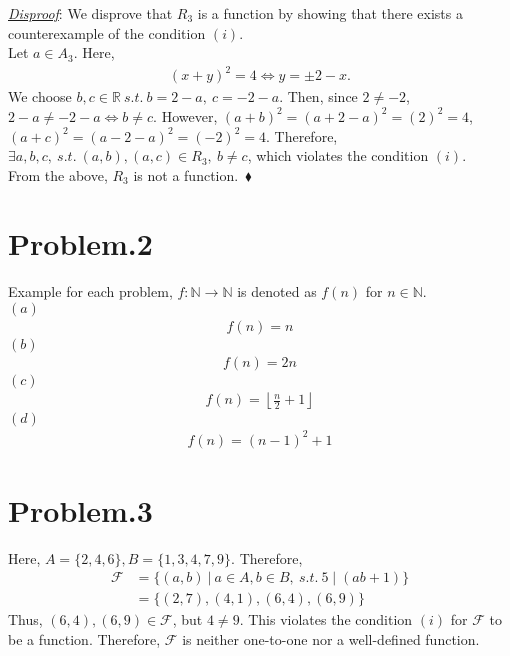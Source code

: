 \documentclass[12pt]{article}
\begin{document}
\underline{\textit{Disproof}}: We disprove that $R_3$ is a function by showing that there exists a counterexample of the condition $(i)$.\\
Let $a \in A_3$. Here,
\begin{gather*}
(x+y)^2 = 4 \Leftrightarrow y = \pm 2 - x.
\end{gather*}
We choose $b,c \in \mathbb{R} ~s.t.~ b = 2 - a,~c = - 2 - a$. Then, since $2 \neq - 2$, $2 - a \neq - 2 - a \Leftrightarrow b \neq c$. However, $(a+b)^2 = (a + 2 - a)^2 = (2)^2 = 4$, $(a+c)^2 = (a - 2 - a)^2 = (- 2)^2 = 4$. Therefore, $\exists a, b, c, ~s.t.~ (a,b),(a,c) \in R_3,~b \neq c$, which violates the condition $(i)$.\\[1em]
From the above, $R_3$ is not a function.~$\blacklozenge$\\[1em]
\section*{Problem.2}
Example for each problem, $f: \mathbb{N} \longrightarrow \mathbb{N}$ is denoted as $f(n)$ for $n \in \mathbb{N}$.\\[1em]
$(a)$\\
\begin{gather*}
f(n) = n
\end{gather*}
$(b)$\\
\begin{gather*}
f(n) = 2n
\end{gather*}
$(c)$\\
\begin{gather*}
f(n) = \left\lfloor{ \frac{n}{2} + 1} \right\rfloor
\end{gather*}
$(d)$\\
\begin{gather*}
f(n) = (n-1)^2 + 1
\end{gather*}
\section*{Problem.3}
Here, $A = \{2,4,6\},B = \{1,3,4,7,9\}$. Therefore,
\begin{align*}
\mathcal{F} &= \{ (a,b) ~|~ a \in A, b \in B, ~s.t.~ 5 \mid (ab + 1) \}\\[1em]
&= \{(2,7),(4,1),(6,4),(6,9) \}
\end{align*}
Thus, $(6,4),(6,9) \in \mathcal{F}$, but $4 \neq 9$. This violates the condition $(i)$ for $\mathcal{F}$ to be a function. Therefore, $\mathcal{F}$ is neither one-to-one nor a well-defined function.
\end{document}
